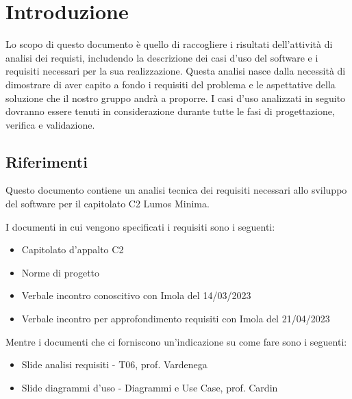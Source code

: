 \documentclass[12pt]{article}
\begin{document}
\section{Introduzione}
Lo scopo di questo documento è quello di raccogliere i risultati dell'attività di analisi dei requisti, includendo la descrizione dei casi d'uso del software e i requisiti necessari per la sua realizzazione.
Questa analisi nasce dalla necessità di dimostrare di aver capito a fondo i requisiti del problema e le aspettative della soluzione che il nostro gruppo andrà a proporre.
I casi d'uso analizzati in seguito dovranno essere tenuti in considerazione durante tutte le fasi di progettazione, verifica e validazione.

\subsection{Riferimenti}
Questo documento contiene un analisi tecnica dei requisiti necessari allo sviluppo del software per il capitolato C2 Lumos Minima.

I documenti in cui vengono specificati i requisiti sono i seguenti:
\begin{itemize}
	\item Capitolato d'appalto C2
	\item Norme di progetto
	\item Verbale incontro conoscitivo con Imola del 14/03/2023
	\item Verbale incontro per approfondimento requisiti con Imola del 21/04/2023
\end{itemize}

Mentre i documenti che ci forniscono un'indicazione su come fare sono i seguenti:
\begin{itemize}
	\item Slide analisi requisiti - T06, prof. Vardenega
	\item Slide diagrammi d'uso - Diagrammi e Use Case, prof. Cardin
\end{itemize}
\end{document}
